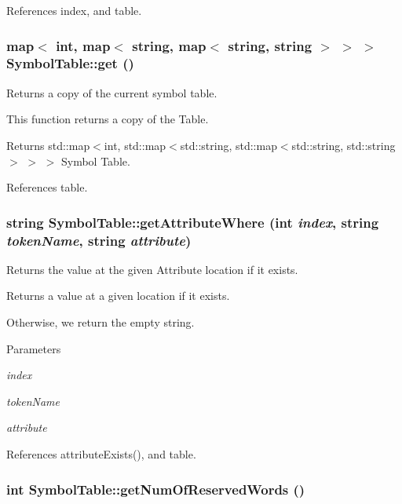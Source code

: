 References index, and table.

\hypertarget{classSymbolTable_ad9429553f1aadeade3339e32e4f4c61e}{
\subsubsection[{get}]{\setlength{\rightskip}{0pt plus 5cm}map$<$ int, map$<$ string, map$<$ string, string $>$ $>$ $>$ SymbolTable::get ()}}
\label{classSymbolTable_ad9429553f1aadeade3339e32e4f4c61e}


Returns a copy of the current symbol table. 

This function returns a copy of the Table.

\begin{DoxyReturn}{Returns}
std::map$<$int, std::map$<$std::string, std::map$<$std::string, std::string$>$ $>$ $>$ Symbol Table. 
\end{DoxyReturn}


References table.

\hypertarget{classSymbolTable_aa5e55d23f3b69e48a8e6c385bd9d509f}{
\subsubsection[{getAttributeWhere}]{\setlength{\rightskip}{0pt plus 5cm}string SymbolTable::getAttributeWhere (int {\em index}, \/  string {\em tokenName}, \/  string {\em attribute})}}
\label{classSymbolTable_aa5e55d23f3b69e48a8e6c385bd9d509f}


Returns the value at the given Attribute location if it exists. 

Returns a value at a given location if it exists.

Otherwise, we return the empty string. 
\begin{DoxyParams}{Parameters}
\item[{\em index}]\item[{\em tokenName}]\item[{\em attribute}]\end{DoxyParams}


References attributeExists(), and table.

\hypertarget{classSymbolTable_a218f832e3d8b4d37cb3aee7af732a0c6}{
\subsubsection[{getNumOfReservedWords}]{\setlength{\rightskip}{0pt plus 5cm}int SymbolTable::getNumOfReservedWords ()}}
\label{classSymbolTable_a218f832e3d8b4d37cb3aee7af732a0c6}


